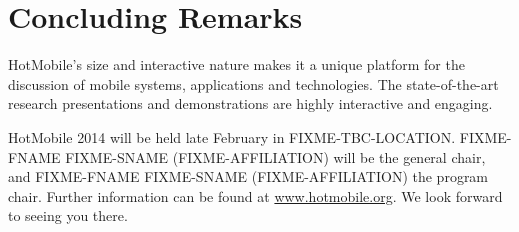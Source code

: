 \section{Concluding Remarks}
\label{sec:conclusion}
HotMobile's size and interactive nature makes it a unique platform for the
discussion of mobile systems, applications and technologies. The state-of-the-art 
research presentations and demonstrations are highly interactive and engaging.

HotMobile 2014 will be held late February in FIXME-TBC-LOCATION. FIXME-FNAME 
FIXME-SNAME (FIXME-AFFILIATION) will be the general chair, and FIXME-FNAME 
FIXME-SNAME (FIXME-AFFILIATION) the program chair. Further information can be 
found at \url{www.hotmobile.org}. We look forward to seeing you there.